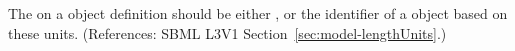 The  on a \Model object definition should be either
,  or the identifier of a \UnitDefinition
object based on these units.  (References: SBML L3V1
Section~\ref{sec:model-lengthUnits}.)
